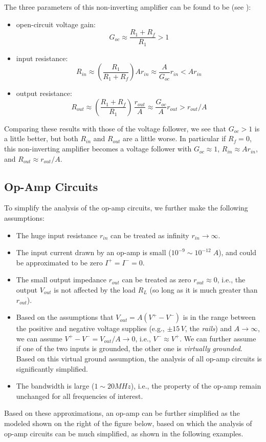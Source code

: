\begin{itemize}
  The three parameters of this non-inverting amplifier can be found 
  to be (see 
  ):
  \begin{itemize}
    \item open-circuit voltage gain:
      \[
      G_{oc} \approx \frac{R_1+R_f}{R_1}>1
      \]
    \item input resistance:
      \[
      R_{in} \approx \left(\frac{R_1}{R_1+R_f}\right)A r_{in}
      \approx\frac{A}{G_{oc}}r_{in}<A r_{in}
      \]
    \item output resistance:
      \[
      R_{out}\approx \left(\frac{R_1+R_f}{R_1} \right)\,\frac{r_{out}}{A} 
      \approx\frac{G_{oc}}{A}r_{out}>r_{out}/A
      \]
  \end{itemize}
  Comparing these results with those of the voltage follower, we see 
  that $G_{oc}>1$ is a little better, but both $R_{in}$ and $R_{out}$ are 
  a little worse. In particular if $R_f=0$, this non-inverting amplifier
  becomes a voltage follower with $G_{oc}\approx 1$, $R_{in}\approx Ar_{in}$,
  and $R_{out}\approx r_{out}/A$.

\end{itemize}


\subsection*{Op-Amp Circuits }


To simplify the analysis of the op-amp circuits, we further make the following 
assumptions:
\begin{itemize}
\item The huge input resistance $r_{in}$ can be treated as infinity 
  $r_{in}\rightarrow \infty$.
\item The input current drawn by an op-amp is small ($10^{-9}\sim10^{-12}\;A$), 
  and could be approximated to be zero $I^+=I^-=0$.
\item The small output impedance $r_{out}$ can be treated as zero $r_{out}\approx 0$,
  i.e., the output $V_{out}$ is not affected by the load $R_L$ (so long as it is
  much greater than $r_{out}$).
\item Based on the assumptions that $V_{out}=A(V^+-V^-)$ is in the range between
  the positive and negative voltage supplies (e.g., $\pm 15\,V$, the {\em rails})
  and $A\rightarrow\infty$, we can assume $V^+-V^-=V_{out}/A\rightarrow 0$, i.e.,
  $V^-\approx V^+$. We can further assume if one of the two inputs is grounded, 
  the other one is {\em virtually grounded}. Based on this virtual ground assumption, 
  the analysis of all op-amp circuits is significantly simplified.
\item The bandwidth is large ($1 \sim 20MHz$), i.e., the property of the op-amp 
  remain unchanged for all frequencies of interest.
\end{itemize}
Based on these approximations, an op-amp can be further simplified as the modeled
shown on the right of the figure below, based on which the analysis of op-amp 
circuits can be much simplified, as shown in the following examples.

